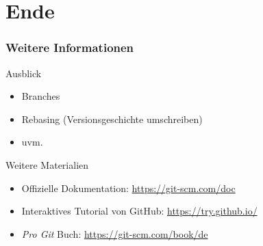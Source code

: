 \documentclass[accentcolor=tud8b,colorbacktitle,inverttitle,landscape,german,presentation,t]{tudbeamer}
\begin{document}
\section*{Ende}
		
		
			\begin{frame}
				\frametitle{Weitere Informationen}
					\begin{block}{Ausblick}
						\begin{itemize}
							\item Branches
							\item Rebasing (Versionsgeschichte umschreiben)
							\item uvm.
						\end{itemize}
					\end{block}
					\begin{block}{Weitere Materialien}
						\begin{itemize}
							\item Offizielle Dokumentation: \href{https://git-scm.com/doc}{https://git-scm.com/doc}
							\item Interaktives Tutorial von GitHub: \href{https://try.github.io/}{https://try.github.io/}
							\item \textit{Pro Git} Buch: \href{https://git-scm.com/book/de}{https://git-scm.com/book/de}
						\end{itemize}
					\end{block}
			\end{frame}
	
\end{document}

